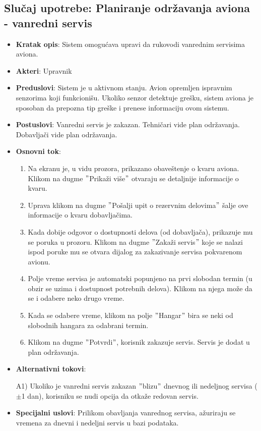 \documentclass[a4paper]{article}
\begin{document}
\subsection{Slučaj upotrebe: Planiranje održavanja aviona - vanredni servis}
\label{subsec:vanredni_servis}
\begin{itemize}
    \item \textbf{Kratak opis}: Sistem omogućava upravi da rukovodi vanrednim servisima aviona.
    \item \textbf{Akteri}: Upravnik
    \item \textbf{Preduslovi}: Sistem je u aktivnom stanju. Avion opremljen ispravnim senzorima koji funkcionišu. Ukoliko senzor detektuje grešku, sistem aviona je sposoban da prepozna tip greške i prenese informaciju ovom sistemu.
    \item \textbf{Postuslovi}: Vanredni servis je zakazan. Tehničari vide plan održavanja. Dobavljači vide plan održavanja.
    \item \textbf{Osnovni tok}:
    \begin{enumerate}
        \item Na ekranu je, u vidu prozora, prikazano obaveštenje o kvaru aviona. Klikom na dugme $"$Prikaži više$"$ otvaraju se detaljnije informacije o kvaru.
        \item Uprava klikom na dugme $"$Pošalji upit o rezervnim delovima$"$ šalje ove informacije o kvaru dobavljačima.
        \item Kada dobije odgovor o dostupnosti delova (od dobavljača), prikazuje mu se poruka u prozoru. Klikom na dugme $"$Zakaži servis$"$ koje se nalazi ispod poruke mu se otvara dijalog za zakazivanje servisa pokvarenom avionu.
        \item Polje vreme servisa je automatski popunjeno na prvi slobodan termin (u obzir se uzima i dostupnost potrebnih delova). Klikom na njega može da se i odabere neko drugo vreme.
        \item Kada se odabere vreme, klikom na polje $"$Hangar$"$ bira se neki od slobodnih hangara za odabrani termin.
        \item Klikom na dugme $"$Potvrdi$"$, korisnik zakazuje servis. Servis je dodat u plan održavanja.
    \end{enumerate}
    
    \item \textbf{Alternativni tokovi}:
        \begin{enumerate}
            A1) Ukoliko je vanredni servis zakazan $"$blizu$"$ dnevnog ili nedeljnog servisa ($\pm$1 dan), korisniku se nudi opcija da otkaže redovan servis.
        \end{enumerate}
    \item \textbf{Specijalni uslovi}: Prilikom obavljanja vanrednog servisa, ažuriraju se vremena za dnevni i nedeljni servis u bazi podataka.
\end{itemize}
\end{document}
